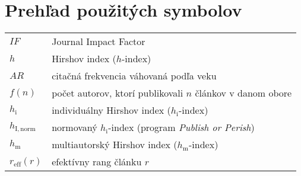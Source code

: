 \chapter*{Prehľad použitých symbolov}

\begin{flushleft}
\begin{longtable}[l]{ll} %
  $IF$              & Journal Impact Factor \\[1mm]
  $h$               & Hirshov index ($h$-index) \\[1mm]
  $AR$              & citačná frekvencia váhovaná podľa veku \\[1mm]  
  $f(n)$            & počet autorov, ktorí publikovali $n$ článkov v danom obore \\[1mm]
  $h_{\mathrm{i}}$       & individuálny Hirshov index ($h_{\mathrm{i}}$-index)  \\[1mm]
  $h_{\mathrm{I, norm}}$  & normovaný $h_{\mathrm{i}}$-index (program {\em Publish or Perish})\\[1mm]
  $h_{\mathrm{m}}$       & multiautorský Hirshov index ($h_{\mathrm{m}}$-index) \\[1mm]
  $r_{\mathrm{eff}}(r)$  & efektívny rang článku $r$\\[1mm]

\end{longtable}
\end{flushleft}



